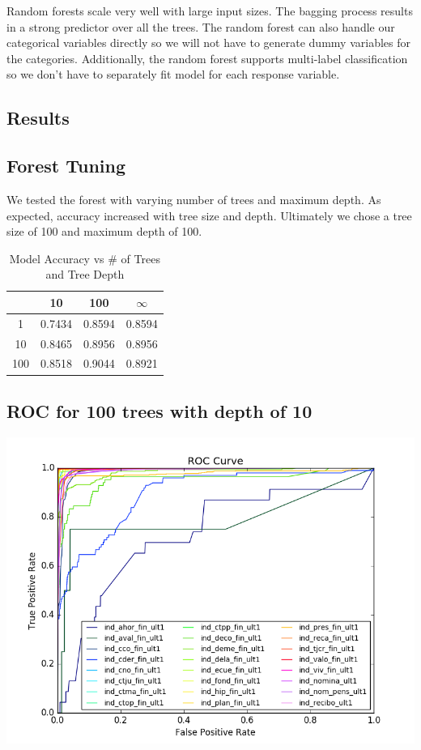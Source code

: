 \documentclass{article}
\begin{document}
\begin{spacing}{1}
\begin{large}
Random forests scale very well with large input sizes. The bagging process results in a strong predictor over all the trees. The random forest can also handle our categorical variables directly so we will not have to generate dummy variables for the categories. Additionally, the random forest supports multi-label classification so we don't have to separately fit model for each response variable.

\subsection{Results}

\subsection{Forest Tuning}

We tested the forest with varying number of trees and maximum depth. As expected, accuracy increased with tree size and depth. Ultimately we chose a tree size of 100 and maximum depth of 100.
\begin{table}[h]
	\centering
	\begin{tabular}{|c|c|c|c|}
		\hline 
		\backslashbox{Trees}{Depth} & 10 & 100 & $\infty$ \\ 
		\hline 
		1 & 0.7434 & 0.8594  & 0.8594 \\ 
		10 & 0.8465 & 0.8956  & 0.8956 \\ 
		100 & 0.8518 & 0.9044  & 0.8921 \\ 
		\hline 
	\end{tabular} 
	\caption{Model Accuracy vs \# of Trees and Tree Depth}
	\label{tab:my_label}
\end{table}


\subsection{ROC for 100 trees with depth of 10}
\begin{center}
	\includegraphics[width = 15cm]{ROC.png}
\end{center}


\end{large}
\end{spacing}
\end{document}
